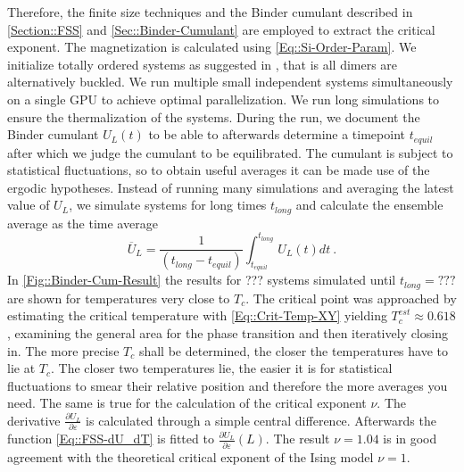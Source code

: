			Therefore, the finite size techniques and the Binder cumulant described in \autoref{Section::FSS} and \autoref{Sec::Binder-Cumulant} are employed to extract the critical exponent. The magnetization is calculated using \autoref{Eq::Si-Order-Param}. We initialize totally ordered systems as suggested in \cite{binder2022monte}, that is all dimers are alternatively buckled. We run multiple small independent systems simultaneously on a single GPU to achieve optimal parallelization. We run long simulations to ensure the thermalization of the systems. During the run, we document the Binder cumulant $U_L(t)$ to be able to afterwards determine a timepoint $t_{equil}$ after which we judge the cumulant to be equilibrated. The cumulant is subject to statistical fluctuations, so to obtain useful averages it can be made use of the ergodic hypotheses. Instead of running many simulations and averaging the latest value of $U_L$, we simulate systems for long times $t_{long}$ and calculate the ensemble average as the time average
			\begin{equation}
				\overline{U}_L =	\frac{1}{(t_{long} - t_{equil})} \int_{t_{equil}}^{t_{long}} U_L(t) dt~.
			\end{equation}
			In \autoref{Fig::Binder-Cum-Result} the results for ??? systems simulated until $t_{long} = ???$ are shown for temperatures very close to $T_c$. The critical point was approached by estimating the critical temperature with \autoref{Eq::Crit-Temp-XY} yielding $T_c^{est} \approx 0.618$, examining the general area for the phase transition and then iteratively closing in. The more precise $T_c$ shall be determined, the closer the temperatures have to lie at $T_c$. The closer two temperatures lie, the easier it is for statistical fluctuations to smear their relative position and therefore the more averages you need. The same is true for the calculation of the critical exponent $\nu$. The derivative $\tfrac{\partial U_L}{\partial \varepsilon}$ is calculated through a simple central difference. Afterwards the function \autoref{Eq::FSS-dU_dT} is fitted to $\tfrac{\partial U_L}{\partial \varepsilon} (L)$. The result $\nu =	1.04$ is in good agreement with the theoretical critical exponent of the Ising model $\nu =	1$.
